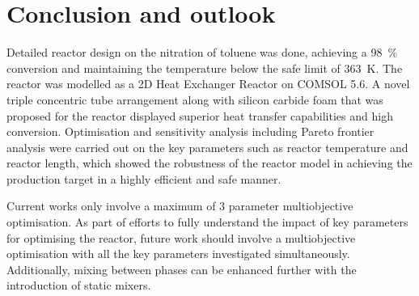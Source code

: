 \section{Conclusion and outlook} \label{sec:conclusion}
Detailed reactor design on the nitration of toluene was done, achieving a \SI{98}{\%} conversion and maintaining the temperature below the safe limit of \SI{363}{\K}. The reactor was modelled as a 2D Heat Exchanger Reactor on COMSOL 5.6. A novel triple concentric tube arrangement along with silicon carbide foam that was proposed for the reactor displayed superior heat transfer capabilities and high conversion. Optimisation and sensitivity analysis including Pareto frontier analysis were carried out on the key parameters such as reactor temperature and reactor length, which showed the robustness of the reactor model in achieving the production target in a highly efficient and safe manner. 

Current works only involve a maximum of 3 parameter multiobjective optimisation. As part of efforts to fully understand the impact of key parameters for optimising the reactor, future work should involve a multiobjective optimisation with all the key parameters investigated simultaneously. Additionally, mixing between phases can be enhanced further with the introduction of static mixers.  


